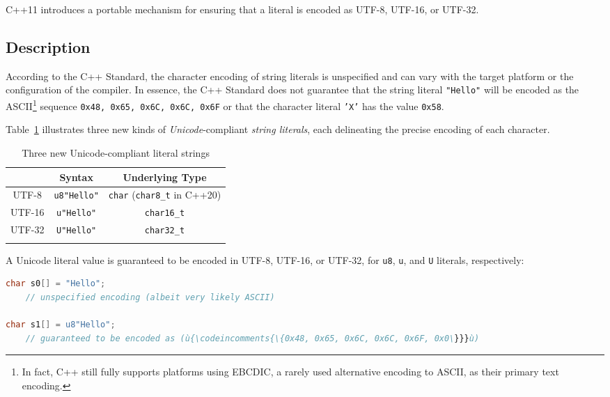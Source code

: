 
C++11 introduces a portable mechanism for ensuring that a literal is
encoded as UTF-8, UTF-16, or UTF-32.

\subsection[Description]{Description}\label{description-unicodestring}

According to the C++ Standard, the character encoding of string literals
is unspecified and can vary with the target platform or the configuration of
the compiler. In essence, the C++ Standard does not guarantee that the
string literal \texttt{"Hello"} will be encoded as the
ASCII{\cprotect\footnote{In fact, C++ still fully supports platforms
  using EBCDIC, a rarely used alternative encoding to ASCII, as their primary text encoding.}} sequence
\texttt{{0x48,} \texttt{0x65,} \texttt{0x6C,} \texttt{0x6C,} \texttt{0x6F}}
or that the character literal \texttt{'X'} has the value
\texttt{0x58}.

Table~\ref{unicodestring-table1} illustrates three new kinds of \emph{Unicode}-compliant
\emph{string literals}, each delineating the precise encoding of each
character.
 \begin{table}[h!]
\begin{center}
\begin{threeparttable}
\caption{Three new Unicode-compliant literal strings}\label{unicodestring-table1}\vspace{1.5ex}
{\small \begin{tabular}{c|c|c}\thickhline
\rowcolor[gray]{.9}{\sffamily\bfseries Encoding} & {\sffamily\bfseries Syntax} & {\sffamily\bfseries Underlying Type}\\ \hline
UTF-8   &  \texttt{u8"Hello"} & \texttt{char} (\texttt{char8\_t} in C++20) \\ \hline
UTF-16 & \texttt{u"Hello"}  & \texttt{char16\_t} \\ \hline
UTF-32  & \texttt{U"Hello"} & \texttt{char32\_t}\\ \thickhline
\end{tabular}
} %
\end{threeparttable}
\end{center} 
\end{table} 

\noindent A Unicode literal value is guaranteed to be encoded in UTF-8, UTF-16, or
UTF-32, for \texttt{u8}, \texttt{u}, and \texttt{U} literals,
respectively:

\begin{lstlisting}[language=C++]
char s0[] = "Hello";
    // unspecified encoding (albeit very likely ASCII)

char s1[] = u8"Hello";
    // guaranteed to be encoded as (ù{\codeincomments{\{0x48, 0x65, 0x6C, 0x6C, 0x6F, 0x0\}}}ù)
\end{lstlisting}
    

